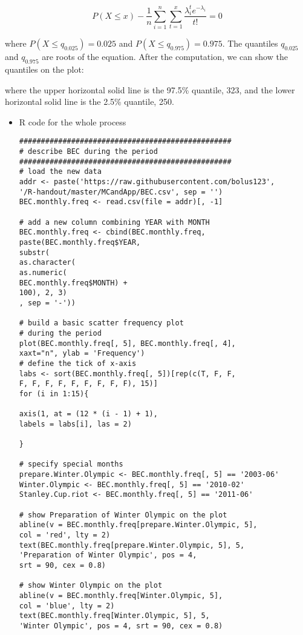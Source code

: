 \documentclass[12pt]{article}
\begin{document}
\begin{equation*}
        P(X \le x) - \frac{1}{n} \sum_{i = 1}^{n} \sum_{t = 1}^{x}\frac{\lambda_i^{t}e^{-\lambda_i}}{t!} = 0
    \end{equation*}

where \(P(X \le q_{0.025}) = 0.025\) and \(P(X \le q_{0.975}) = 0.975\).
The quantiles \(q_{0.025}\) and \(q_{0.975}\) are roots of the equation.
After the computation, we can show the quantiles on the plot:

where the upper horizontal solid line is the 97.5\% quantile, 323, and
the lower horizontal solid line is the 2.5\% quantile, 250.

\begin{itemize}
\item
  R code for the whole process

\begin{verbatim}
#################################################
# describe BEC during the period
#################################################
# load the new data
addr <- paste('https://raw.githubusercontent.com/bolus123', 
'/R-handout/master/MCandApp/BEC.csv', sep = '')
BEC.monthly.freq <- read.csv(file = addr)[, -1]

# add a new column combining YEAR with MONTH
BEC.monthly.freq <- cbind(BEC.monthly.freq, 
paste(BEC.monthly.freq$YEAR, 
substr(
as.character(
as.numeric(
BEC.monthly.freq$MONTH) + 
100), 2, 3)
, sep = '-'))

# build a basic scatter frequency plot 
# during the period
plot(BEC.monthly.freq[, 5], BEC.monthly.freq[, 4], 
xaxt="n", ylab = 'Frequency')
# define the tick of x-axis
labs <- sort(BEC.monthly.freq[, 5])[rep(c(T, F, F, 
F, F, F, F, F, F, F, F, F), 15)]
for (i in 1:15){

axis(1, at = (12 * (i - 1) + 1), 
labels = labs[i], las = 2)

}

# specify special months
prepare.Winter.Olympic <- BEC.monthly.freq[, 5] == '2003-06'
Winter.Olympic <- BEC.monthly.freq[, 5] == '2010-02'
Stanley.Cup.riot <- BEC.monthly.freq[, 5] == '2011-06'

# show Preparation of Winter Olympic on the plot
abline(v = BEC.monthly.freq[prepare.Winter.Olympic, 5], 
col = 'red', lty = 2)
text(BEC.monthly.freq[prepare.Winter.Olympic, 5], 5, 
'Preparation of Winter Olympic', pos = 4, 
srt = 90, cex = 0.8)

# show Winter Olympic on the plot 
abline(v = BEC.monthly.freq[Winter.Olympic, 5], 
col = 'blue', lty = 2)
text(BEC.monthly.freq[Winter.Olympic, 5], 5, 
'Winter Olympic', pos = 4, srt = 90, cex = 0.8)


\end{verbatim}
\end{itemize}
\end{document}
